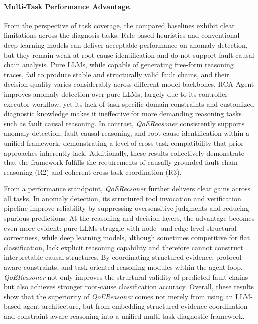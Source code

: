 \documentclass[sigconf,10pt]{acmart} %
\begin{document}
\paragraph{Multi-Task Performance Advantage.}
From the perspective of task coverage, the compared baselines exhibit clear limitations across the diagnosis tasks. Rule-based heuristics and conventional deep learning models can deliver acceptable performance on anomaly detection, but they remain weak at root-cause identification and do not support fault causal chain analysis. Pure LLMs, while capable of generating free-form reasoning traces, fail to produce stable and structurally valid fault chains, and their decision quality varies considerably across different model backbones. RCA-Agent improves anomaly detection over pure LLMs, largely due to its controller-executor workflow, yet its lack of task-specific domain constraints and customized diagnostic knowledge makes it ineffective for more demanding reasoning tasks such as fault causal reasoning. In contrast, \textit{QoEReasoner} consistently supports anomaly detection, fault causal reasoning, and root-cause identification within a unified framework, demonstrating a level of cross-task compatibility that prior approaches inherently lack. 
Additionally, these results collectively demonstrate that the framework fulfills the requirements of causally grounded fault-chain reasoning (R2) and coherent cross-task coordination (R3).

From a performance standpoint, \textit{QoEReasoner} further delivers clear gains across all tasks. In anomaly detection, its structured tool invocation and verification pipeline improve reliability by suppressing oversensitive judgments and reducing spurious predictions. At the reasoning and decision layers, the advantage becomes even more evident: pure LLMs struggle with node- and edge-level structural correctness, while deep learning models, although sometimes competitive for flat classification, lack explicit reasoning capability and therefore cannot construct interpretable causal structures. By coordinating structured evidence, protocol-aware constraints, and task-oriented reasoning modules within the agent loop, \textit{QoEReasoner} not only improves the structural validity of predicted fault chains but also achieves stronger root-cause classification accuracy. Overall, these results show that the superiority of \textit{QoEReasoner} comes not merely from using an LLM-based agent architecture, but from embedding structured evidence coordination and constraint-aware reasoning into a unified multi-task diagnostic framework.
\end{document}
